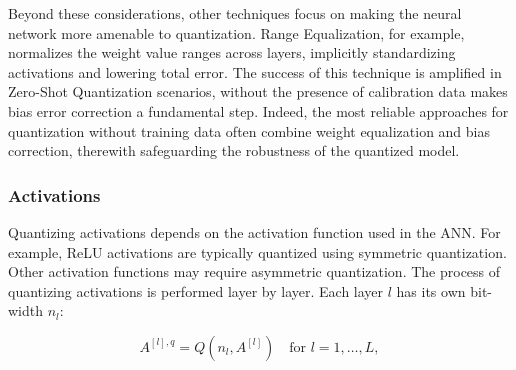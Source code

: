 Beyond these considerations, other techniques focus on making the neural network more amenable to quantization. Range Equalization, for example, normalizes the weight value ranges across layers, implicitly standardizing activations and lowering total error. The success of this technique is amplified in Zero-Shot Quantization scenarios, without the presence of calibration data makes bias error correction a fundamental step. Indeed, the most reliable approaches for quantization without training data often combine weight equalization and bias correction, therewith safeguarding the robustness of the quantized model.

\subsubsection*{Activations}

Quantizing activations depends on the activation function used in the ANN. For example, ReLU activations are typically quantized using symmetric quantization. Other activation functions may require asymmetric quantization. The process of quantizing activations is performed layer by layer. Each layer $l$ has its own bit-width $n_l$: 

\begin{equation}
A^{[l],q} = Q(n_l, A^{[l]}) \quad \text{for } l = 1, \dots, L,
\end{equation}


